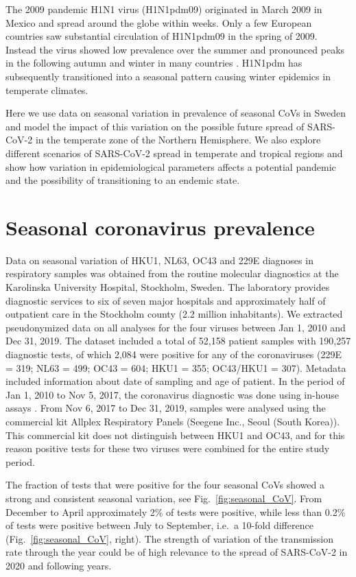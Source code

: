 \documentclass[rmp, reprint, superscriptaddress, floatfix,amsmath]{revtex4-1}
\begin{document}
The 2009 pandemic H1N1 virus (H1N1pdm09) originated in March 2009 in Mexico and spread around the globe within weeks.
Only a few European countries saw substantial circulation of H1N1pdm09 in the spring of 2009. Instead the virus showed low prevalence over the summer and pronounced peaks in the following autumn and winter in many countries \citep{amato-gauci_surveillance_2011}.
H1N1pdm has subsequently transitioned into a seasonal pattern causing winter epidemics in temperate climates.

Here we use data on seasonal variation in prevalence of seasonal CoVs in Sweden and model the impact of this variation on the possible future spread of SARS-CoV-2 in the temperate zone of the Northern Hemisphere. 
We also explore different scenarios of SARS-CoV-2 spread in temperate and tropical regions and show how variation in epidemiological parameters affects a potential pandemic and the possibility of transitioning to an endemic state. 

\section{Seasonal coronavirus prevalence} 

Data on seasonal variation of HKU1, NL63, OC43 and 229E diagnoses in respiratory samples was obtained from the routine molecular diagnostics at the Karolinska University Hospital, Stockholm, Sweden. The laboratory provides diagnostic services to six of seven major hospitals and approximately half of outpatient care in the Stockholm county (2.2 million inhabitants). We extracted pseudonymized data on all analyses for the four viruses between Jan 1, 2010 and Dec 31, 2019. The dataset included a total of 52,158 patient samples with 190,257 diagnostic tests, of which 2,084 were positive for any of the coronaviruses (229E = 319; NL63 = 499; OC43 = 604; HKU1 = 355; OC43/HKU1 = 307). Metadata included information about date of sampling and age of patient. 
In the period of Jan 1, 2010 to Nov 5, 2017, the coronavirus diagnostic was done using in-house assays \citep{tiveljung2009development}. From Nov 6, 2017 to Dec 31, 2019, samples were analysed using the commercial kit Allplex Respiratory Panels (Seegene Inc., Seoul (South Korea)). This commercial kit does not distinguish between HKU1 and OC43, and for this reason positive tests for these two viruses were combined for the entire study period. 

The fraction of tests that were positive for the four seasonal CoVs showed a strong and consistent seasonal variation, see Fig.~\ref{fig:seasonal_CoV}. 
From December to April approximately 2\%  of tests were positive, while less than 0.2\% of tests were positive between July to September, i.e.~a 10-fold difference (Fig.~\ref{fig:seasonal_CoV}, right).
The strength of variation of the transmission rate through the year could be of high relevance to the spread of SARS-CoV-2 in 2020 and following years. 
\end{document}
